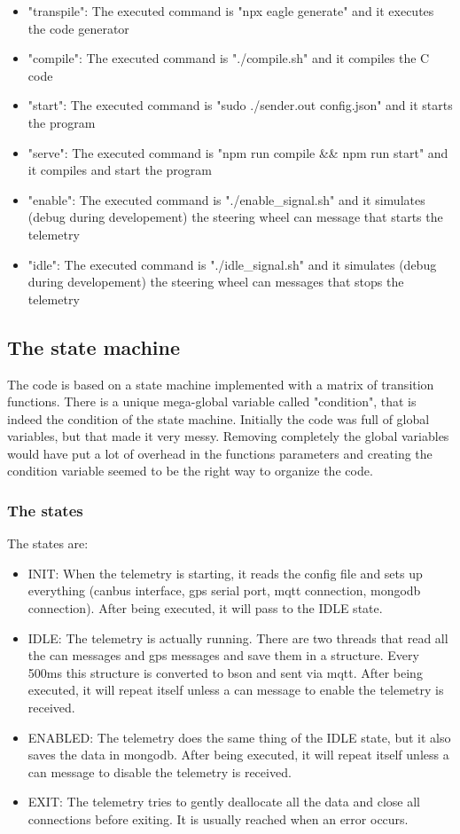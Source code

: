 \begin{itemize}
    \item "transpile": The executed command is "npx eagle generate" and it executes the code generator
    \item "compile": The executed command is "./compile.sh" and it compiles the C code
    \item "start": The executed command is "sudo ./sender.out config.json" and it starts the program
    \item "serve": The executed command is "npm run compile \&\& npm run start" and it compiles and start the program
    \item "enable": The executed command is "./enable\_signal.sh" and it simulates (debug during developement) the steering wheel can message that starts the telemetry 
    \item "idle": The executed command is "./idle\_signal.sh" and it simulates (debug during developement) the steering wheel can messages that stops the telemetry 
\end{itemize}

\subsection{The state machine}

The code is based on a state machine implemented with a matrix of transition functions. There is a unique mega-global variable called "condition", that is indeed the condition of the 
state machine. Initially the code was full of global variables, but that made it very messy. Removing completely the 
global variables would have put a lot of overhead in the functions parameters and creating the condition variable seemed to
be the right way to organize the code.

\subsubsection{The states}

The states are:

\begin{itemize}
    \item INIT: When the telemetry is starting, it reads the config file and sets up everything (canbus interface, gps serial port, mqtt connection, mongodb connection). After being executed, it will pass to the IDLE state.
    \item IDLE: The telemetry is actually running. There are two threads that read all the can messages and gps messages and save them in a structure. Every 500ms this structure is converted to bson and sent via mqtt. After being executed, it will repeat itself unless a can message to enable the telemetry is received.
    \item ENABLED: The telemetry does the same thing of the IDLE state, but it also saves the data in mongodb. After being executed, it will repeat itself unless a can message to disable the telemetry is received.
    \item EXIT: The telemetry tries to gently deallocate all the data and close all connections before exiting. It is usually reached when an error occurs.
\end{itemize}

